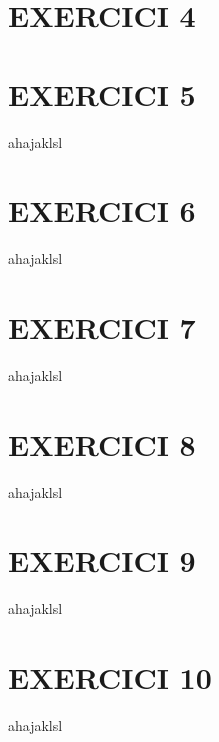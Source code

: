 \documentclass[a4paper, 11pt]{article}
\begin{document}

\section*{EXERCICI 4}
\noindent 
\vspace{5mm}


\section*{EXERCICI 5}
\noindent ahajaklsl
\vspace{5mm}


\section*{EXERCICI 6}
\noindent ahajaklsl
\vspace{5mm}


\section*{EXERCICI 7}
\noindent ahajaklsl
\vspace{5mm}


\section*{EXERCICI 8}
\noindent ahajaklsl
\vspace{5mm}


\section*{EXERCICI 9}
\noindent ahajaklsl
\vspace{5mm}


\section*{EXERCICI 10}
\noindent ahajaklsl
\vspace{5mm}
\end{document}
